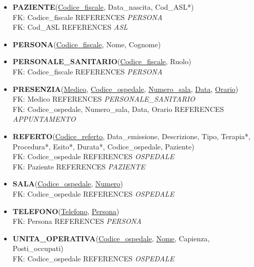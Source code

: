 \documentclass[a4paper,12pt]{report}
\begin{document}
\begin{itemize}
  \item \textbf{PAZIENTE}(\underline{Codice\_fiscale}, Data\_nascita, Cod\_ASL*)
  \\ FK: Codice\_fiscale REFERENCES \emph{PERSONA}
  \\ FK: Cod\_ASL REFERENCES \emph{ASL}
  \item \textbf{PERSONA}(\underline{Codice\_fiscale}, Nome, Cognome)
  \item \textbf{PERSONALE\_SANITARIO}(\underline{Codice\_fiscale}, Ruolo)
  \\ FK: Codice\_fiscale REFERENCES \emph{PERSONA}
  \item \textbf{PRESENZIA}(\underline{Medico}, \underline{Codice\_ospedale}, \underline{Numero\_sala}, \underline{Data}, \underline{Orario})
  \\ FK: Medico REFERENCES \emph{PERSONALE\_SANITARIO}
  \\ FK: Codice\_ospedale, Numero\_sala, Data, Orario REFERENCES \emph{APPUNTAMENTO}
  \item \textbf{REFERTO}(\underline{Codice\_referto}, Data\_emissione, Descrizione, Tipo, Terapia*, Procedura*, Esito*, Durata*, Codice\_ospedale, Paziente)
  \\ FK: Codice\_ospedale REFERENCES \emph{OSPEDALE}
  \\ FK: Paziente REFERENCES \emph{PAZIENTE}
  \item \textbf{SALA}(\underline{Codice\_ospedale}, \underline{Numero})
  \\ FK: Codice\_ospedale REFERENCES \emph{OSPEDALE}
  \item \textbf{TELEFONO}(\underline{Telefono}, \underline{Persona})
  \\ FK: Persona REFERENCES \emph{PERSONA}
  \item \textbf{UNITA\_OPERATIVA}(\underline{Codice\_ospedale}, \underline{Nome}, Capienza, Posti\_occupati)
  \\ FK: Codice\_ospedale REFERENCES \emph{OSPEDALE}
\end{itemize}
\end{document}
